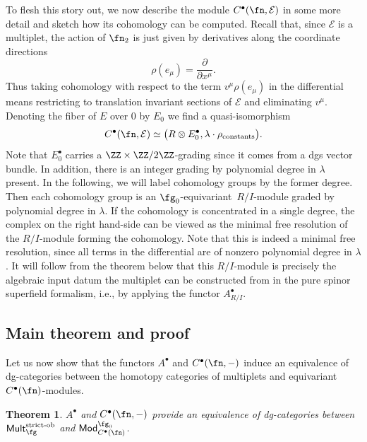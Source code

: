 \documentclass[10pt,a4paper]{amsart}
\numberwithin{equation}{section}
\newtheorem{thm}{Theorem}[section]
\def\cE{\mathcal E}\def\cF{\mathcal F}\def\cG{\mathcal G}\def\cH{\mathcal H}
\def\cat#1{\ensuremath{\mathsf{#1}}}
\DeclareMathOperator{\Mod}{\cat{Mod}}
\DeclareMathOperator{\Mult}{\cat{Mult}}
\begin{document}
To flesh this story out, we now describe the module $C^\bullet(\fn , \cE)$ in some more detail and sketch how its cohomology can be computed. Recall that, since $\cE$ is a multiplet, the action of $\fn_2$ is just given by derivatives along the coordinate directions
\begin{equation*}
\rho(e_\mu) = \frac{\partial}{\partial x^\mu} .
\end{equation*}
Thus taking cohomology with respect to the term $v^\mu \rho(e_\mu)$ in the differential means restricting to translation invariant sections of $\cE$ and eliminating $v^\mu$. Denoting the fiber of $E$ over 0 by $E_0$ we find a quasi-isomorphism
\begin{equation} \label{eq: compute C^bu}
C^\bullet(\fn ,\cE) \simeq \big( R \otimes E_0^\bullet , \lambda \cdot \rho_{\mathrm{constants}} \big) .
\end{equation}
Note that $E_0^\bullet$ carries a $\ZZ \times \ZZ/2\ZZ$-grading since it comes from a dgs vector bundle. In addition, there is an integer grading by polynomial degree in $\lambda$ present. In the following, we will label cohomology groups by the former degree. Then each cohomology group is an $\fg_0$-equivariant~$R/I$-module graded by polynomial degree in $\lambda$. If the cohomology is concentrated in a single degree, the complex on the right hand-side can be viewed as the minimal free resolution of the $R/I$-module forming the cohomology. Note that this is indeed a minimal free resolution, since all terms in the differential are of nonzero polynomial degree in $\lambda$. It will follow from the theorem below that this $R/I$-module is precisely the algebraic input datum the multiplet can be constructed from in the pure spinor superfield formalism, i.e., by applying the functor $A^\bullet_{R/I}$.


\subsection{Main theorem and proof}
Let us now show that the functors $A^\bullet$ and $C^\bullet(\fn,-)$ induce an equivalence of dg-categories between the homotopy categories of multiplets and equivariant $C^\bullet({\fn})$-modules.


\begin{thm} \label{thm: equiv}
	$A^\bullet$ and $C^\bullet(\fn , - )$ provide an equivalence of dg-categories between $\Mult_\fg^{\text{\rm strict-ob}}$ and $\Mod^{\fg_0}_{C^\bullet({\fn})}$.
\end{thm}
\end{document}
